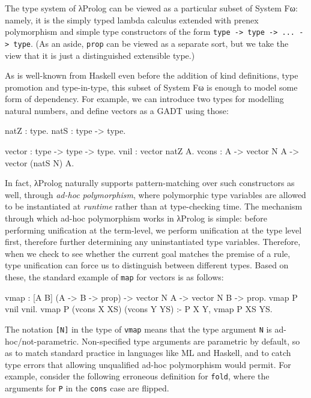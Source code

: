 \documentclass[format=acmlarge,review,anonymous]{acmart}\settopmatter{printfolios=true}
\begin{document}

The type system of λProlog can be viewed as a particular subset of System Fω: namely, it is the
simply typed lambda calculus extended with prenex polymorphism and simple type constructors of the
form \texttt{type -> type -> ... -> type}. (As an aside, \texttt{prop} can be viewed as a separate
sort, but we take the view that it is just a distinguished extensible type.)

As is well-known from Haskell even before the addition of kind definitions, type promotion and
type-in-type, this subset of System Fω is enough to model some form of dependency. For example, we
can introduce two types for modelling natural numbers, and define vectors as a GADT using those:

\begin{codequote}
natZ : type.
natS : type -> type.

vector : type -> type -> type.
vnil : vector natZ A.
vcons : A -> vector N A -> vector (natS N) A.
\end{codequote}

In fact, λProlog naturally supports pattern-matching over such constructors as well, through
\emph{ad-hoc polymorphism}, where polymorphic type variables are allowed to be instantiated at
\emph{runtime} rather than at type-checking time. The mechanism through which ad-hoc polymorphism
works in λProlog is simple: before performing unification at the term-level, we perform unification
at the type level first, therefore further determining any uninstantiated type variables.
Therefore, when we check to see whether the current goal matches the premise of a rule, type
unification can force us to distinguish between different types. Based on these, the standard
example of \texttt{map} for vectors is as follows:

\begin{codequote}
vmap : [A B] (A -> B -> prop) -> vector N A -> vector N B -> prop.
vmap P vnil vnil.
vmap P (vcons X XS) (vcons Y YS) :- P X Y, vmap P XS YS.
\end{codequote}

The notation \texttt{{[}N{]}} in the type of \texttt{vmap} means that the type argument \texttt{N}
is ad-hoc/not-parametric. Non-specified type arguments are parametric by default, so as to match
standard practice in languages like ML and Haskell, and to catch type errors that allowing
unqualified ad-hoc polymorphism would permit. For example, consider the following erroneous
definition for \texttt{fold}, where the arguments for \texttt{P} in the \texttt{cons} case are
flipped.
\end{document}
